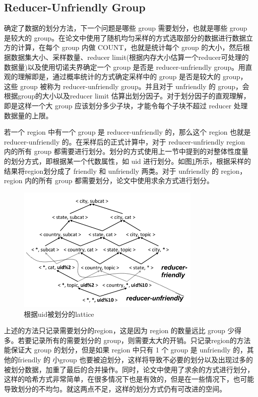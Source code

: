 \subsection{Reducer-Unfriendly Group}

确定了数据的划分方法，下一个问题是哪些 group 需要划分，也就是哪些 group 是较大的 group。在论文中使用了随机均匀采样的方式选取部分的数据进行数据立方的计算，在每个 group 内做 COUNT，也就是统计每个 group 的大小，然后根据数据集大小、采样数量、reducer limit(根据内存大小估算一个reducer可处理的数据量)以及使用切诺夫界确定一个 group 是否是 reducer-unfriendly group。用直观的理解即是，通过概率统计的方式确定采样中的 group 是否是较大的 group，这些 group 被称为 reducer-unfriendly group。并且对于 unfriendly 的 group，会根据group的大小以及reducer limit 估算出划分因子。对于划分因子的直观理解，即是这样一个大 group 应该划分多少子块，才能令每个子块不超过 reducer 处理数据量的上限。

若一个 region 中有一个 group 是 reducer-unfriendly 的，那么这个 region 也就是 reducer-unfriendly 的。在采样后的正式计算中，对于 reducer-unfriendly region 内的所有 group 都需要进行划分。划分的方式使用上一节中提到的对整体性度量的划分方式，即根据某一个代数属性，如 uid 进行划分。如图\ref{region_partition}所示，根据采样的结果将region划分成了 friendly 和 unfriendly 两类。对于 unfriendly 的 region，region 内的所有 group 都需要划分，论文中使用求余方式进行划分。

\begin{figure}[!htb]
\centering\includegraphics[width=3.5in]{picture/ch_datacube_mr/region_partition} 
\caption{根据uid被划分的lattice}\label{region_partition} 
\end{figure} 

上述的方法只记录需要划分的region，这是因为 region 的数量远比 group 少得多。若要记录所有的需要划分的 group，则需要太大的开销。只记录region的方法能保证大 group 的划分，但是如果 region 中只有 1 个 group 是 unfriendly 的，其他的friendly 的 小group 也要被迫划分，这样将导致不必要的划分以及出现过多的被划分数据，加重了最后的合并操作。同时，论文中使用了求余的方式进行划分，这样的哈希方式非常简单，在很多情况下也是有效的，但是在一些情况下，也可能导致划分的不均匀。就这两点不足，这样的划分方式仍有可改进的空间。

